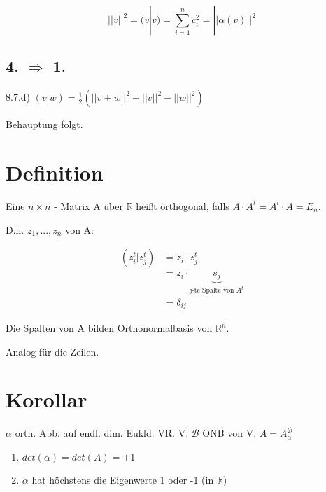 \documentclass[a4paper, openany]{book}
\begin{document}
        \[ ||v||^2 = (v|v) = \sum_{i=1}^n c_i^2 = || \alpha(v) ||^2\]

        \subsection*{4. $\Rightarrow$ 1.}

        8.7.d) $(v|w) = \frac{1}{2} (||v + w||^2 - ||v||^2 - ||w||^2)$

        \par \medskip

        Behauptung folgt. 

        \section{Definition}

        Eine $n \times n$ - Matrix A über $\mathbb{R}$ heißt \underline{orthogonal}, falls $A \cdot A^t = A^t \cdot A = E_n$.

        \par \medskip

        D.h. $z_1, ..., z_n$ von A:

        \begin{align*} 
            (z_i^t | z_j^t) & = z_i \cdot z_j^t \\
                            & = z_i \cdot \underbrace{s_j}_{\text{j-te Spalte von $A^t$}} \\
                            & = \delta_{ij}
        \end{align*}

        Die Spalten von A bilden Orthonormalbasis von $\mathbb{R}^n$.

        Analog für die Zeilen.

        \section{Korollar}

        $\alpha$ orth. Abb. auf endl. dim.  Eukld. VR. V, $\mathcal{B}$ ONB von V, $A = A_{\alpha}^{\mathcal{B}}$

        \begin{enumerate}[label=(\alph*)]
          \item $det(\alpha) = det(A) = \pm 1$

          \item $\alpha$ hat höchstens die Eigenwerte 1 oder -1 (in $\mathbb{R}$)

        \end{enumerate}
\end{document}
